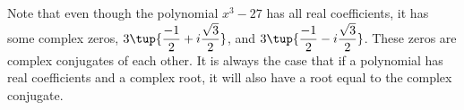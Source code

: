 Note that even though the polynomial $x^{3}-27$ has all real coefficients,
it has some complex zeros, $3\tup{\displaystyle
\frac{-1}{2}+i\displaystyle\frac{\sqrt{3}}{2}} $, and $3\tup{
\displaystyle\frac{-1}{2}-i\displaystyle\frac{\sqrt{3}}{2}} $. 
These zeros are complex conjugates of each other. It is always the case that if a polynomial has real 
coefficients and a complex root, it will also
have a root equal to the complex conjugate.

